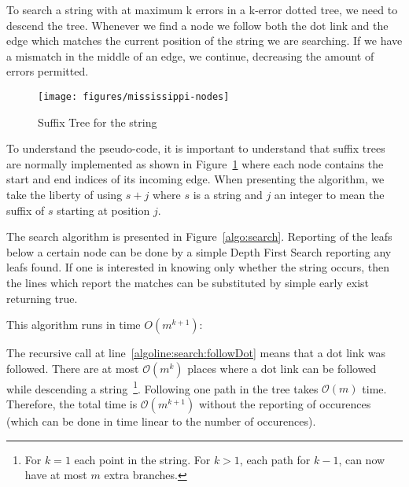 To search a string with at maximum k errors in a k-error dotted tree, we need to descend the tree. Whenever we find a node we follow both the dot link and the edge which matches the current position of the string we are searching. If we have a mismatch in the middle of an edge, we continue, decreasing the amount of errors permitted.

\begin{figure}
\texttt{[image: figures/mississippi-nodes]}
\caption{Suffix Tree for the string }%
\label{fig:mississippi-nodes}
\end{figure}

To understand the pseudo-code, it is important to understand that suffix trees are normally implemented as shown in Figure~\ref{fig:mississippi-nodes} where each node contains the start and end indices of its incoming edge. When presenting the algorithm, we take the liberty of using $s+j$ where $s$ is a string and $j$ an integer to mean the suffix of $s$ starting at position $j$.



The search algorithm is presented in Figure~\ref{algo:search}. Reporting of the leafs below a certain node can be done by a simple Depth First Search reporting any leafs found. If one is interested in knowing only whether the string occurs, then the lines which report the matches can be substituted by simple early exist returning true.

This algorithm runs in time $O(m^{k+1})$:

The recursive call at line~\ref{algoline:search:followDot} means that a dot link was followed. There are at most $\mathcal{O}(m^k)$ places where a dot link can be followed while descending a string~\footnote{For $k=1$ each point in the string. For $k>1$, each path for $k-1$, can now have at most $m$ extra branches.}. Following one path in the tree takes $\mathcal{O}(m)$ time. Therefore, the total time is $\mathcal{O}(m^{k+1})$ without the reporting of occurences (which can be done in time linear to the number of occurences).
